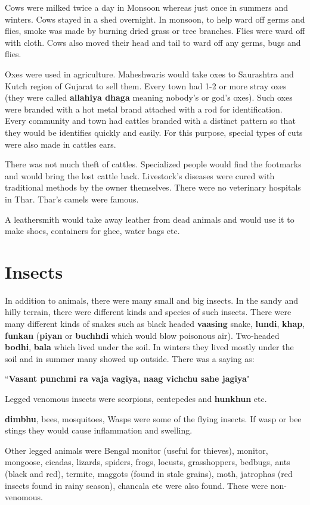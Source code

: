 Cows were milked twice a day in Monsoon whereas just once in summers and
winters. Cows stayed in a shed overnight. In monsoon, to help ward off germs
and flies, smoke was made by burning dried grass or tree branches. Flies were
ward off with cloth. Cows also moved their head and tail to ward off any germs,
bugs and flies.

Oxes were used in agriculture. Maheshwaris would take oxes to Saurashtra and
Kutch region of Gujarat to sell them. Every town had 1-2 or more stray oxes
(they were called \textbf{allahiya dhaga} meaning nobody's or god's oxes). Such
oxes were branded with a hot metal brand attached with a rod for
identification. Every community and town had cattles branded with a distinct
pattern so that they would be identifies quickly and easily. For this purpose,
special types of cuts were also made in cattles ears.

There was not much theft of cattles. Specialized people would find the
footmarks and would bring the lost cattle back. Livestock's diseases were cured
with traditional methods by the owner themselves. There were no veterinary
hospitals in Thar. Thar's camels were famous.

A leathersmith would take away leather from dead animals and would use it to
make shoes, containers for ghee, water bags etc.

\section{Insects}
In addition to animals, there were many small and big insects. In the sandy and
hilly terrain, there were different kinds and species of such insects. There
were many different kinds of snakes such as black headed \textbf{vaasing}
snake, \textbf{lundi}, \textbf{khap}, \textbf{funkan} (\textbf{piyan} or
\textbf{buchhdi} which would blow poisonous air). Two-headed \textbf{bodhi},
\textbf{bala} which lived under the soil. In winters they lived mostly under
the soil and in summer many showed up outside. There was a saying as:

``\textbf{Vasant punchmi ra vaja vagiya, naag vichchu sahe jagiya}"

Legged venomous insects were scorpions, centepedes and \textbf{hunkhun} etc.

\textbf{dimbhu}, bees, mosquitoes, Wasps were some of the flying insects. If
wasp or bee stings they would cause inflammation and swelling. 

Other legged animals were Bengal monitor (useful for thieves), monitor,
mongoose, cicadas, lizards, spiders, frogs, locusts, grasshoppers, bedbugs,
ants (black and red), termite, maggots (found in stale grains), moth, jatrophas
(red insects found in rainy season), chancala etc were also found. These were
non-venomous.

